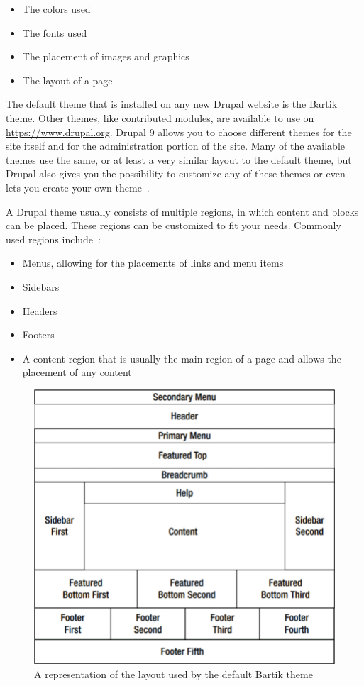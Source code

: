 \begin{itemize}
	\item  The colors used
	\item  The fonts used
	\item  The placement of images and graphics
	\item  The layout of a page
\end{itemize}

The default theme that is installed on any new Drupal website is the Bartik theme. Other themes, like contributed modules, are available to use on \url{https://www.drupal.org}. Drupal 9 allows you to choose different themes for the site itself and for the administration portion of the site. Many of the available themes use the same, or at least a very similar layout to the default theme, but Drupal also gives you the possibility to customize any of these themes or even lets you create your own theme~\autocite{Tomlinson2015}.

A Drupal theme usually consists of multiple regions, in which content and blocks can be placed. These regions can be customized to fit your needs. Commonly used regions include~\autocite{Tomlinson2015}: 
\begin{itemize}
	\item  Menus, allowing for the placements of links and menu items
	\item  Sidebars
	\item  Headers
	\item  Footers
	\item  A content region that is usually the main region of a page and allows the placement of any content
\end{itemize}

\begin{figure}
	\centering
	\includegraphics{./img/Bartik_Theme.png}
	\caption[The Bartik theme]{A representation of the layout used by the default Bartik theme ~\autocite{Tomlinson2015}}
\end{figure}


